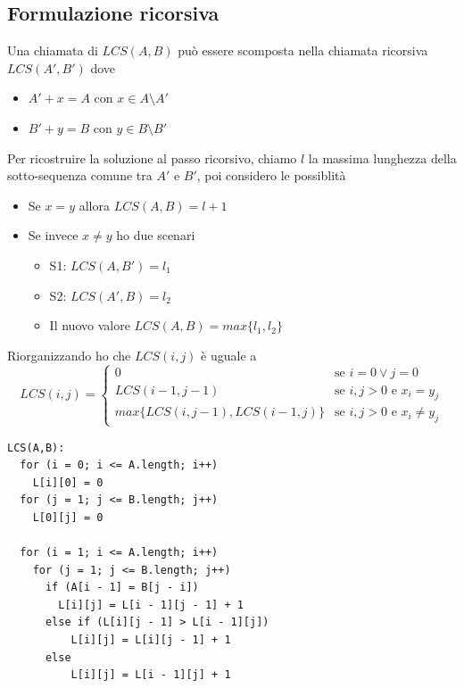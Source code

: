 \documentclass{article}
\begin{document}
\subsection*{Formulazione ricorsiva}
Una chiamata di \(LCS(A,B)\) può essere scomposta nella chiamata ricorsiva \(LCS(A',B')\) dove
\begin{itemize}
  \item \(A' + x = A\) con \(x \in A \setminus A'\)
  \item \(B' + y = B\) con \(y \in B \setminus B'\)
\end{itemize}
Per ricostruire la soluzione al passo ricorsivo, chiamo \(l\) la massima lunghezza della sotto-sequenza comune tra \(A'\) e \(B'\), poi considero le possiblità
\begin{itemize}
  \item Se \(x = y\) allora \(LCS(A,B) = l + 1\)
  \item Se invece \(x \neq y\) ho due scenari
        \begin{itemize}
          \item S1: \(LCS(A, B') = l_1\)
          \item S2: \(LCS(A', B) = l_2\)
          \item Il nuovo valore \(LCS(A,B) = max\{l_1, l_2\}\)
        \end{itemize}
\end{itemize}
Riorganizzando ho che \(LCS(i,j)\) è uguale a
\begin{equation*}
  LCS(i,j) =
  \begin{cases}
    0                                   & \text{se } i = 0 \lor j = 0                \\
    LCS(i - 1, j - 1)                   & \text{se } i,j > 0 \text{ e } x_i = y_j    \\
    max\{LCS(i, j - 1), LCS(i - 1, j)\} & \text{se } i,j > 0 \text{ e } x_i \neq y_j
  \end{cases}
\end{equation*}

\begin{verbatim}
LCS(A,B):
  for (i = 0; i <= A.length; i++)
    L[i][0] = 0
  for (j = 1; j <= B.length; j++)
    L[0][j] = 0

  for (i = 1; i <= A.length; i++)
    for (j = 1; j <= B.length; j++)
      if (A[i - 1] = B[j - i])
        L[i][j] = L[i - 1][j - 1] + 1
      else if (L[i][j - 1] > L[i - 1][j])
          L[i][j] = L[i][j - 1] + 1
      else 
          L[i][j] = L[i - 1][j] + 1
\end{verbatim}
\end{document}
